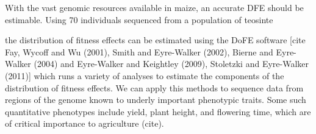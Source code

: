 With the vast genomic resources available in maize, an accurate DFE should be estimable. Using 70 individuals sequenced from a population of teosinte 





	

 the distribution of fitness effects can be estimated using the DoFE software [cite Fay, Wycoff and Wu (2001), Smith and Eyre-Walker (2002), Bierne and Eyre-Walker (2004) and Eyre-Walker and Keightley (2009), Stoletzki and Eyre-Walker (2011)] which runs a variety of analyses to estimate the components of the distribution of fitness effects. We can apply this methods to sequence data from regions of the genome known to underly important phenotypic traits. Some such quantitative phenotypes include yield, plant height, and flowering time, which are of critical importance to agriculture (cite).

